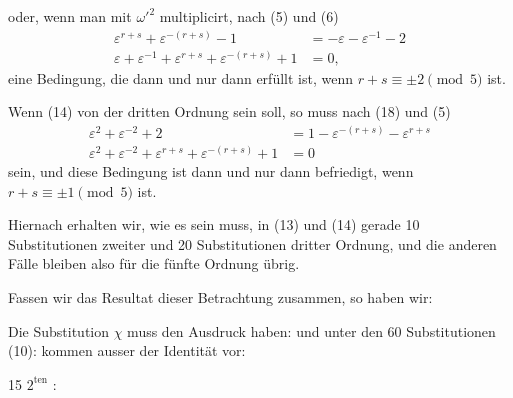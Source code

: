 oder, wenn man mit $\omega'^2$ multiplicirt, nach (5) und (6)
\[
\begin{aligned}
\varepsilon^{r+s} + \varepsilon^{-(r+s)} - 1 &= -\varepsilon - \varepsilon^{-1} - 2 \\
\varepsilon + \varepsilon^{-1} + \varepsilon^{r+s} + \varepsilon^{-(r+s)} + 1 &= 0,
\end{aligned}
\]
eine Bedingung, die dann und nur dann erfüllt ist, wenn
$r + s \equiv \pm 2 \pmod{5}$ ist.

Wenn (14) von der dritten Ordnung sein soll, so muss
nach (18) und (5)
\[
\begin{aligned}
\varepsilon^2 + \varepsilon^{-2} + 2 &= 1 - \varepsilon^{-(r+s)} - \varepsilon^{r+s} \\
\varepsilon^2 + \varepsilon^{-2} + \varepsilon^{r+s} + \varepsilon^{-(r+s)} + 1 &= 0
\end{aligned}
\]
sein, und diese Bedingung ist dann und nur dann befriedigt,
wenn $r + s \equiv \pm 1 \pmod{5}$ ist.

Hiernach erhalten wir, wie es sein muss, in (13) und (14)
gerade 10 Substitutionen zweiter und 20 Substitutionen dritter
Ordnung, und die anderen Fälle bleiben also für die fünfte Ordnung
übrig.

Fassen wir das Resultat dieser Betrachtung zusammen, so
haben wir:

Die Substitution $\chi$ muss den Ausdruck haben:
und unter den 60 Substitutionen (10):
kommen ausser der Identität vor:

15  $2^{\text{ten}}$ :

